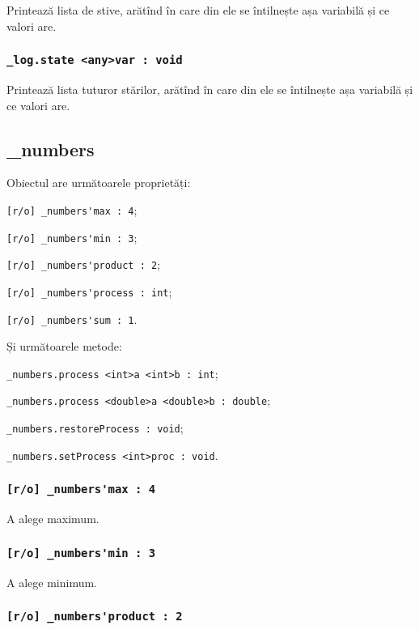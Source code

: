 Printează lista de stive, arătînd în care din ele se întilnește așa variabilă și ce valori are.

\subsubsection{\lstinline|_log.state <any>var : void|}

Printează lista tuturor stărilor, arătînd în care din ele se întilnește așa variabilă și ce valori are.

\subsection{{\color{orange} \_numbers}}

Obiectul \numbers{} are următoarele proprietăți:
\begin{icItems}
	\item \lstinline|[r/o] _numbers'max : 4|;
	\item \lstinline|[r/o] _numbers'min : 3|;
	\item \lstinline|[r/o] _numbers'product : 2|;
	\item \lstinline|[r/o] _numbers'process : int|;
	\item \lstinline|[r/o] _numbers'sum : 1|.
\end{icItems}

Și următoarele metode:
\begin{icItems}
	\item \lstinline|_numbers.process <int>a <int>b : int|;
	\item \lstinline|_numbers.process <double>a <double>b : double|;
	\item \lstinline|_numbers.restoreProcess : void|;
	\item \lstinline|_numbers.setProcess <int>proc : void|.
\end{icItems}

\subsubsection{\lstinline|[r/o] _numbers'max : 4|}

A alege maximum.

\subsubsection{\lstinline|[r/o] _numbers'min : 3|}

A alege minimum.

\subsubsection{\lstinline|[r/o] _numbers'product : 2|}

